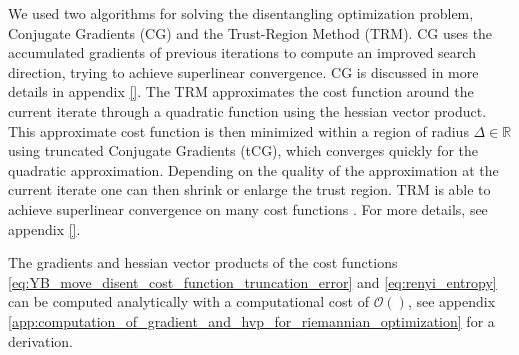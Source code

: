 We used two algorithms for solving the disentangling optimization problem, Conjugate Gradients (CG) and the Trust-Region Method (TRM). CG uses the accumulated gradients of previous iterations to compute an improved search direction, trying to achieve superlinear convergence. CG is discussed in more details in appendix \ref{}. The TRM approximates the cost function around the current iterate through a quadratic function using the hessian vector product. This approximate cost function is then minimized within a region of radius $\Delta\in\mathbb{R}$ using truncated Conjugate Gradients (tCG), which converges quickly for the quadratic approximation. Depending on the quality of the approximation at the current iterate one can then shrink or enlarge the trust region. TRM is able to achieve superlinear convergence on many cost functions \cite{cite:optimization_on_matrix_manifolds}. For more details, see appendix \ref{}. \par
The gradients and hessian vector products of the cost functions \eqref{eq:YB_move_disent_cost_function_truncation_error} and \eqref{eq:renyi_entropy} can be computed analytically with a computational cost of $\mathcal{O}()$, see appendix \ref{app:computation_of_gradient_and_hvp_for_riemannian_optimization} for a derivation.
